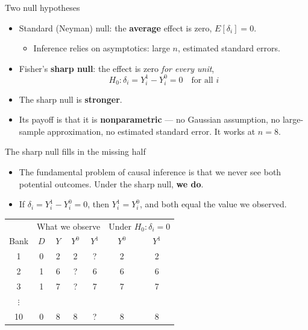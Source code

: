 \documentclass[
  11pt,
  ignorenonframetext,
  aspectratio=169,
]{beamer}
\providecommand{\tightlist}{%
  \setlength{\itemsep}{0pt}\setlength{\parskip}{0pt}}
\begin{document}
\begin{frame}{Two null hypotheses}
\protect{}\label{two-null-hypotheses}
\begin{itemize}
\tightlist
\item
  Standard (Neyman) null: the \textbf{average} effect is zero,
  \(E[\delta_i] = 0\).

  \begin{itemize}
  \tightlist
  \item
    Inference relies on asymptotics: large \(n\), estimated standard
    errors.
  \end{itemize}
\item
  Fisher's \textbf{sharp null}: the effect is zero \emph{for every
  unit}, \[
  H_0: \delta_i = Y_i^1 - Y_i^0 = 0 \quad \text{for all } i
  \]
\item
  The sharp null is \textbf{stronger}.
\item
  Its payoff is that it is \textbf{nonparametric} --- no Gaussian
  assumption, no large-sample approximation, no estimated standard
  error. It works at \(n = 8\).
\end{itemize}
\end{frame}

\begin{frame}{The sharp null fills in the missing half}
\protect{}\label{the-sharp-null-fills-in-the-missing-half}
\begin{itemize}
\tightlist
\item
  The fundamental problem of causal inference is that we never see both
  potential outcomes. Under the sharp null, \textbf{we do}.
\item
  If \(\delta_i = Y_i^1 - Y_i^0 = 0\), then \(Y_i^1 = Y_i^0\), and both
  equal the value we observed.
\end{itemize}

\begin{center}
\small
\begin{tabular}{c|cc|cc||cc}
\toprule
 & \multicolumn{4}{c||}{What we observe} & \multicolumn{2}{c}{Under $H_0: \delta_i = 0$} \\
Bank & $D$ & $Y$ & $Y^0$ & $Y^1$ & $Y^0$ & $Y^1$ \\
\midrule
1 & 0 & 2 & 2 & ? & 2 & 2 \\
2 & 1 & 6 & ? & 6 & 6 & 6 \\
3 & 1 & 7 & ? & 7 & 7 & 7 \\
$\vdots$ & & & & & & \\
10 & 0 & 8 & 8 & ? & 8 & 8 \\
\bottomrule
\end{tabular}
\end{center}
\end{frame}
\end{document}
